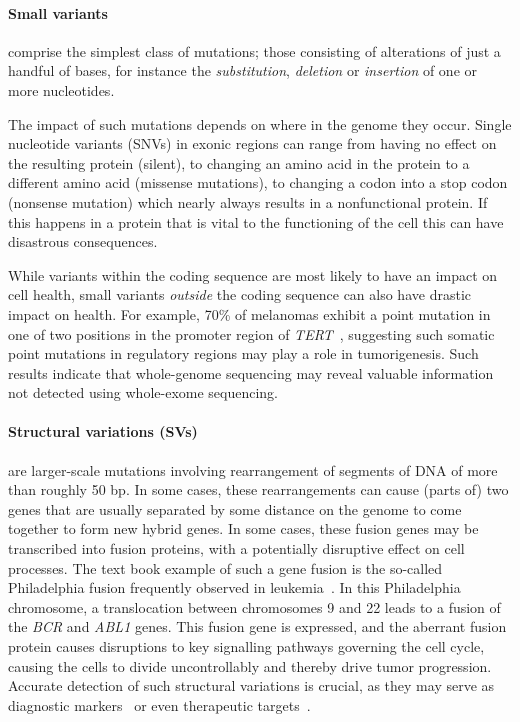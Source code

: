 \begin{justify}
\paragraph{Small variants} comprise the simplest class of mutations; those consisting of alterations of just a handful of bases, for instance the \emph{substitution}, \emph{deletion} or \emph{insertion} of one or more nucleotides.

The impact of such mutations depends on where in the genome they occur. Single nucleotide variants (SNVs) in exonic regions can range from having no effect on the resulting protein (silent), to changing an amino acid in the protein to a different amino acid (missense mutations), to changing a codon into a stop codon (nonsense mutation) which nearly always results in a nonfunctional protein. If this happens in a protein that is vital to the functioning of the cell this can have disastrous consequences. %

While variants within the coding sequence are most likely to have an impact on cell health, small variants \emph{outside} the coding sequence can also have drastic impact on health. For example, 70\% of melanomas exhibit a point mutation in one of two positions in the promoter region of \emph{TERT}~\cite{horn2013tert,huang2013highly}, suggesting such somatic point mutations in regulatory regions may play a role in tumorigenesis. Such results indicate that whole-genome sequencing may reveal valuable information not detected using whole-exome sequencing.

\paragraph{Structural variations (SVs)} are larger-scale mutations involving rearrangement of segments of DNA of more than roughly 50 bp. In some cases, these rearrangements can cause (parts of) two genes that are usually separated by some distance on the genome to come together to form new hybrid genes. In some cases, these fusion genes may be transcribed into fusion proteins, with a potentially disruptive effect on cell processes. The text book example of such a gene fusion is the so-called Philadelphia fusion frequently observed in leukemia~\cite{de1982cellular}. In this Philadelphia chromosome, a translocation between chromosomes 9 and 22 leads to a fusion of the \emph{BCR} and \emph{ABL1} genes. This fusion gene is expressed, and the aberrant fusion protein causes disruptions to key signalling pathways governing the cell cycle, causing the cells to divide uncontrollably and thereby drive tumor progression. Accurate detection of such structural variations is crucial, as they may serve as diagnostic markers~\cite{nowell1960chromosome,nowell1961chromosome} or even therapeutic targets~\cite{druker2001activity,druker2001efficacy}.


\end{justify}

